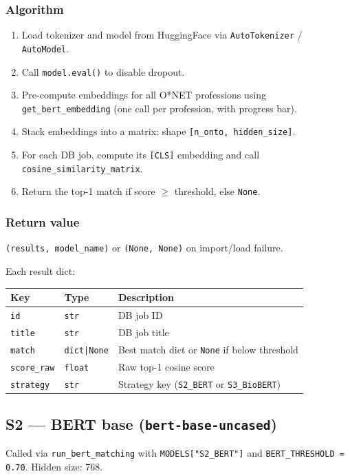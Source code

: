 ﻿\documentclass[12pt,a4paper]{article}
\begin{document}
\subsubsection*{Algorithm}
\begin{enumerate}[noitemsep]
  \item Load tokenizer and model from HuggingFace via \texttt{AutoTokenizer} / \texttt{AutoModel}.
  \item Call \texttt{model.eval()} to disable dropout.
  \item Pre-compute embeddings for all O*NET professions using \texttt{get\_bert\_embedding} (one call per profession, with progress bar).
  \item Stack embeddings into a matrix: shape \texttt{[n\_onto, hidden\_size]}.
  \item For each DB job, compute its \texttt{[CLS]} embedding and call \texttt{cosine\_similarity\_matrix}.
  \item Return the top-1 match if score $\geq$ threshold, else \texttt{None}.
\end{enumerate}

\subsubsection*{Return value}
\texttt{(results, model\_name)} or \texttt{(None, None)} on import/load failure.

Each result dict:
\begin{longtable}{@{}P{3.5cm}P{2.5cm}P{8.5cm}@{}}
\toprule
\textbf{Key} & \textbf{Type} & \textbf{Description} \\
\midrule
\endhead
\texttt{id} & \texttt{str} & DB job ID \\
\texttt{title} & \texttt{str} & DB job title \\
\texttt{match} & \texttt{dict|None} & Best match dict or \texttt{None} if below threshold \\
\texttt{score\_raw} & \texttt{float} & Raw top-1 cosine score \\
\texttt{strategy} & \texttt{str} & Strategy key (\texttt{S2\_BERT} or \texttt{S3\_BioBERT}) \\
\bottomrule
\end{longtable}

\subsection{S2 --- BERT base (\texttt{bert-base-uncased})}
Called via \texttt{run\_bert\_matching} with \texttt{MODELS["S2\_BERT"]} and \texttt{BERT\_THRESHOLD = 0.70}. Hidden size: 768.
\end{document}
